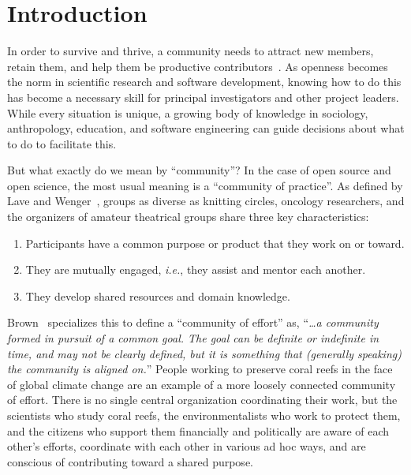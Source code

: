 \documentclass[10pt,letterpaper]{article}
\begin{document}
\section*{Introduction}

In order to survive and thrive,
a community needs to attract new members,
retain them,
and help them be productive contributors~\cite{qureshi2011}.
As openness becomes the norm in scientific research and software development,
knowing how to do this has become a necessary skill for principal investigators and other project leaders.
While every situation is unique, 
a growing body of knowledge in sociology, anthropology, education, and software engineering
can guide decisions about what to do to facilitate this.

But what exactly do we mean by ``community''?
In the case of open source and open science,
the most usual meaning is a ``community of practice''.
As defined by Lave and Wenger~\cite{lave1991,wenger1999},
groups as diverse as knitting circles,
oncology researchers,
and the organizers of amateur theatrical groups
share three key characteristics:

\begin{enumerate}

\item Participants have a common purpose or product that they work on or toward.

\item They are mutually engaged, \textit{i.e.}, they assist and mentor each another.

\item They develop shared resources and domain knowledge.

\end{enumerate}

Brown~\cite{brown2019} specializes this to define a ``community of effort'' as,
``\textit{{\ldots}a community formed in pursuit of a common goal.
The goal can be definite or indefinite in time,
and may not be clearly defined,
but it is something that (generally speaking) the community is aligned on.}'' People working to preserve coral reefs in the face of global climate change are an example of
a more loosely connected community of effort.
There is no single central organization coordinating their work,
but the scientists who study coral reefs,
the environmentalists who work to protect them,
and the citizens who support them financially and politically
are aware of each other's efforts,
coordinate with each other in various ad hoc ways,
and are conscious of contributing toward a shared purpose.
\end{document}
